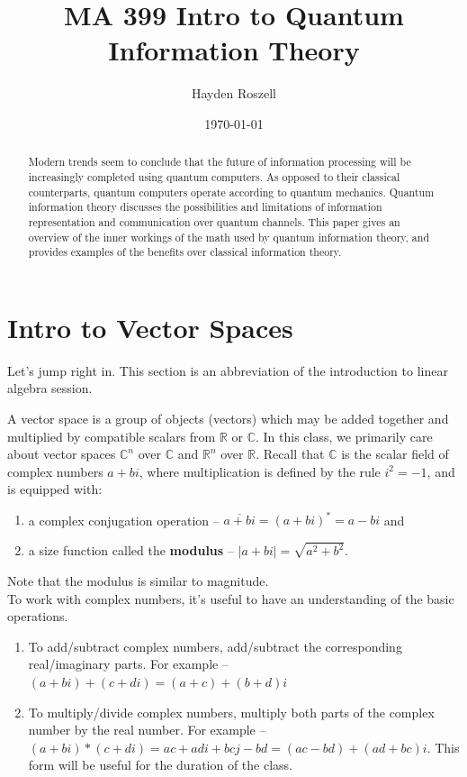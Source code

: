 \documentclass[12pt]{article}
\title{MA 399 Intro to Quantum Information Theory}
\author{Hayden Roszell}
\date{\today}
\theoremstyle{plain}
\theoremstyle{nonumberplain}
\theoremstyle{plain}
\theoremstyle{nonumberplain}
\newcommand\ol{\overline}
\newcommand\1{{\bf 1}}
\newcommand{\R}{\mathbb{R}} %
\newcommand{\C}{\mathbb{C}} %
\newcommand{\<}{\left\langle}
\renewcommand{\>}{\right\rangle}
\newcommand{\abs}[1]{\left\lvert #1 \right\rvert} %
\begin{document}
\maketitle
\begin{abstract}
Modern trends seem to conclude that the future of information processing will be increasingly completed using quantum computers. As opposed to their classical counterparts, quantum computers operate according to quantum mechanics. Quantum information theory discusses the possibilities and limitations of information representation and communication over quantum channels. This paper gives an overview of the inner workings of the math used by quantum information theory, and provides examples of the benefits over classical information theory.
\end{abstract}

\tableofcontents

\section{Intro to Vector Spaces}

Let's jump right in. This section is an abbreviation of the introduction to linear algebra session.

A vector space is a group of objects (vectors) which may be added together and multiplied by compatible scalars from $\R$ or $\C$. In this class, we primarily care about vector spaces $\C^n$ over $\C$ and $\R^n$ over $\R$. Recall that $\C$ is the scalar field of complex numbers $a+bi$, where multiplication is defined by the rule $i^2=-1$, and is equipped with:
\begin{enumerate}[label=(\alph*)]
    \item a complex conjugation operation -- $\ol{a+bi}=(a+bi)^*=a-bi$ and
    \item a size function called the \textbf{modulus} -- $\abs{a+bi}=\sqrt{a^2+b^2}.$
\end{enumerate}
Note that the modulus is similar to magnitude. \\
To work with complex numbers, it's useful to have an understanding of the basic operations.
\begin{enumerate}[label=(\alph*)]
	\item To add/subtract complex numbers, add/subtract the corresponding real/imaginary parts. For 		example -- $(a+bi)+(c+di)=(a+c)+(b+d)i$
	\item To multiply/divide complex numbers, multiply both parts of the complex number by the real 		number. For example -- $(a+bi)*(c+di)=ac+adi+bcj-bd=(ac-bd)+(ad+bc)i$. This form will be useful 		for the duration of the class.
\end{enumerate}
\end{document}
